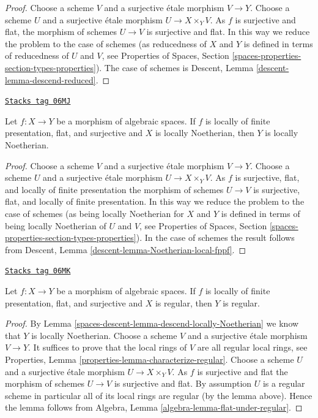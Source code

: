 \begin{proof}
Choose a scheme $V$ and a surjective \'etale morphism $V \to Y$.
Choose a scheme $U$ and a surjective \'etale morphism
$U \to X \times_Y V$. As $f$ is surjective and flat, the morphism of
schemes $U \to V$ is surjective and flat. In this way we reduce the
problem to the case of schemes (as reducedness of $X$ and $Y$ is defined
in terms of reducedness of $U$ and $V$, see
Properties of Spaces,
Section \ref{spaces-properties-section-types-properties}).
The case of schemes is
Descent, Lemma \ref{descent-lemma-descend-reduced}.
\end{proof}

\begin{lemma}
\label{spaces-descent-lemma-descend-locally-Noetherian}
\href{https://stacks.math.columbia.edu/tag/06MJ}{\texttt{Stacks tag 06MJ}}

Let $f : X \to Y$ be a morphism of algebraic spaces.
If $f$ is locally of finite presentation, flat, and surjective and
$X$ is locally Noetherian, then $Y$ is locally Noetherian.
\end{lemma}

\begin{proof}
Choose a scheme $V$ and a surjective \'etale morphism $V \to Y$.
Choose a scheme $U$ and a surjective \'etale morphism
$U \to X \times_Y V$. As $f$ is surjective, flat, and locally of
finite presentation the morphism of schemes $U \to V$ is surjective, flat, and
locally of finite presentation. In this way we reduce the
problem to the case of schemes (as being locally Noetherian for $X$ and $Y$
is defined in terms of being locally Noetherian of $U$ and $V$, see
Properties of Spaces,
Section \ref{spaces-properties-section-types-properties}).
In the case of schemes the result follows from
Descent, Lemma \ref{descent-lemma-Noetherian-local-fppf}.
\end{proof}

\begin{lemma}
\label{spaces-descent-lemma-descend-regular}
\href{https://stacks.math.columbia.edu/tag/06MK}{\texttt{Stacks tag 06MK}}

Let $f : X \to Y$ be a morphism of algebraic spaces.
If $f$ is locally of finite presentation, flat, and surjective and
$X$ is regular, then $Y$ is regular.
\end{lemma}

\begin{proof}
By
Lemma \ref{spaces-descent-lemma-descend-locally-Noetherian}
we know that $Y$ is locally Noetherian.
Choose a scheme $V$ and a surjective \'etale morphism $V \to Y$.
It suffices to prove that the local rings of $V$ are all regular local
rings, see
Properties, Lemma \ref{properties-lemma-characterize-regular}.
Choose a scheme $U$ and a surjective \'etale morphism
$U \to X \times_Y V$. As $f$ is surjective and flat the morphism of schemes
$U \to V$ is surjective and flat. By assumption $U$ is a regular scheme
in particular all of its local rings are regular (by the lemma above).
Hence the lemma follows from
Algebra, Lemma \ref{algebra-lemma-flat-under-regular}.
\end{proof}

